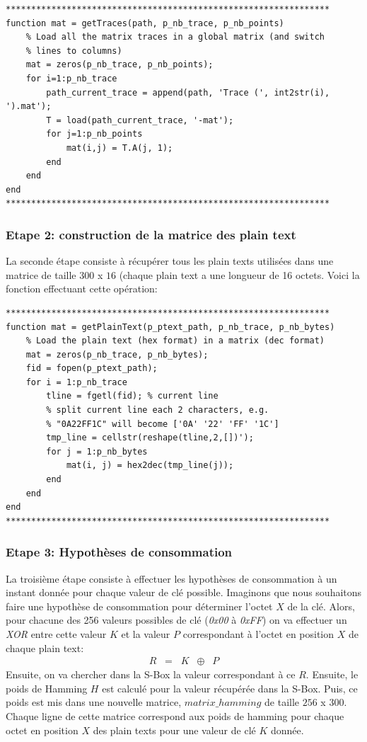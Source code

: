 \documentclass[a4paper, 12pt]{article}
\begin{document}
\begin{lstlisting}
****************************************************************
function mat = getTraces(path, p_nb_trace, p_nb_points)
    % Load all the matrix traces in a global matrix (and switch 
    % lines to columns)
    mat = zeros(p_nb_trace, p_nb_points);
    for i=1:p_nb_trace
        path_current_trace = append(path, 'Trace (', int2str(i), ').mat');
        T = load(path_current_trace, '-mat');
        for j=1:p_nb_points
            mat(i,j) = T.A(j, 1);
        end
    end
end
****************************************************************
\end{lstlisting}

		\subsubsection{Etape 2: construction de la matrice des plain text}
		La seconde étape consiste à récupérer tous les plain texts utilisées dans une matrice de taille $300$ x $16$ (chaque plain text a une longueur de 16 octets. Voici la fonction effectuant cette opération:\\
\begin{lstlisting}
****************************************************************
function mat = getPlainText(p_ptext_path, p_nb_trace, p_nb_bytes)
    % Load the plain text (hex format) in a matrix (dec format)
    mat = zeros(p_nb_trace, p_nb_bytes);
    fid = fopen(p_ptext_path);
    for i = 1:p_nb_trace
        tline = fgetl(fid); % current line
        % split current line each 2 characters, e.g. 
        % "0A22FF1C" will become ['0A' '22' 'FF' '1C']
        tmp_line = cellstr(reshape(tline,2,[])'); 
        for j = 1:p_nb_bytes
            mat(i, j) = hex2dec(tmp_line(j));
        end
    end
end
****************************************************************
\end{lstlisting}

		\subsubsection{Etape 3: Hypothèses de consommation}
		La troisième étape consiste à effectuer les hypothèses de consommation à un instant donnée pour chaque valeur de clé possible. 
		Imaginons que nous souhaitons faire une hypothèse de consommation pour déterminer l'octet $X$ de la clé. Alors, pour chacune des 256 valeurs possibles de clé (\emph{0x00} à \emph{0xFF}) on va effectuer un \emph{XOR} entre cette valeur $K$ et la valeur $P$ correspondant à l'octet en position $X$ de chaque plain text:
		\begin{align*}
		R \;\; = \;\; K \;\; \oplus \;\; P
		\end{align*}
Ensuite, on va chercher dans la S-Box la valeur correspondant à ce $R$. Ensuite, le poids de Hamming $H$ est calculé pour la valeur récupérée dans la S-Box. Puis, ce poids est mis dans une nouvelle matrice, $matrix\_hamming$ de taille $256$ x $300$. Chaque ligne de cette matrice correspond aux poids de hamming pour chaque octet en position $X$ des plain texts pour une valeur de clé $K$ donnée. 
\end{document}
